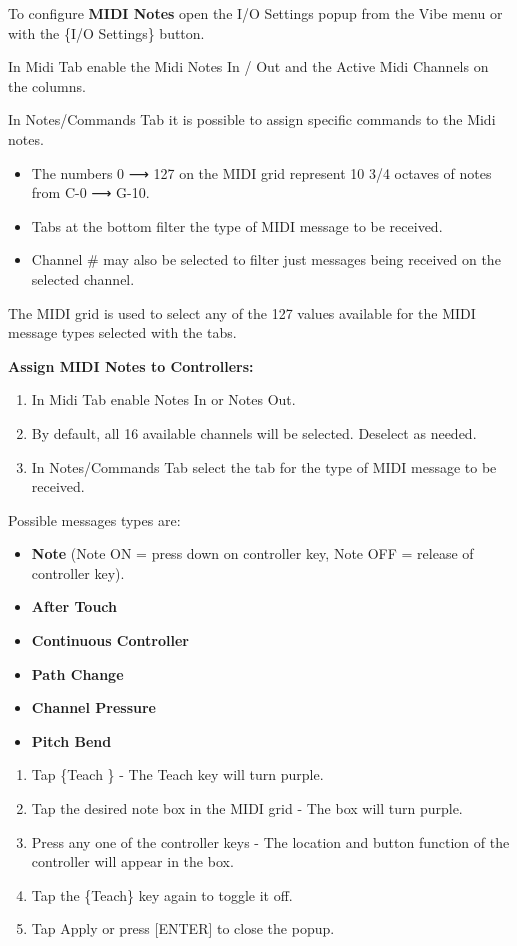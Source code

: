 \documentclass[
]{article}
\begin{document}
To configure \textbf{MIDI Notes} open the I/O Settings popup from the Vibe menu or with the \{I/O Settings\} button.

In Midi Tab enable the Midi Notes In / Out and the Active Midi Channels on the columns.

In Notes/Commands Tab it is possible to assign specific commands to the Midi notes.

\begin{itemize}
\item
  The numbers 0 ⟶ 127 on the MIDI grid represent 10 3/4 octaves of notes from C-0 ⟶ G-10.
\item
  Tabs at the bottom filter the type of MIDI message to be received.
\item
  Channel \# may also be selected to filter just messages being received on the selected channel.
\end{itemize}

The MIDI grid is used to select any of the 127 values available for the MIDI message types selected with the tabs.

\textbf{Assign MIDI Notes to Controllers:}

\begin{enumerate}
\def\labelenumi{\arabic{enumi}.}
\item
  In Midi Tab enable Notes In or Notes Out.
\item
  By default, all 16 available channels will be selected. Deselect as needed.
\item
  In Notes/Commands Tab select the tab for the type of MIDI message to be received.
\end{enumerate}

Possible messages types are:

\begin{itemize}
\item
  \textbf{Note} (Note ON = press down on controller key, Note OFF = release of controller key).
\item
  \textbf{After Touch}
\item
  \textbf{Continuous Controller}
\item
  \textbf{Path Change}
\item
  \textbf{Channel Pressure}
\item
  \textbf{Pitch Bend}
\end{itemize}

\begin{enumerate}
\def\labelenumi{\arabic{enumi}.}
\setcounter{enumi}{3}
\item
  Tap \{Teach \} - The Teach key will turn purple.
\item
  Tap the desired note box in the MIDI grid - The box will turn purple.
\item
  Press any one of the controller keys - The location and button function of the controller will appear in the box.
\item
  Tap the \{Teach\} key again to toggle it off.
\item
  Tap Apply or press {[}ENTER{]} to close the popup.
\end{enumerate}
\end{document}
